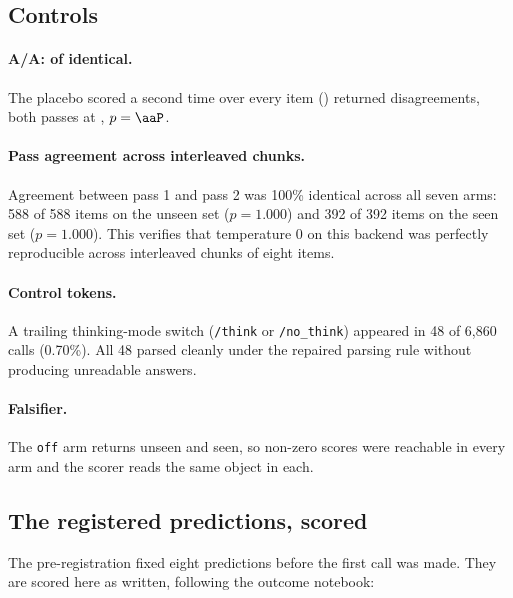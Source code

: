 \subsection{Controls}

\paragraph{A/A: \NUM{\aaPairs} of \NUM{\aaPairs} identical.} The placebo
scored a second time over every item () returned
\NUM{\aaDisagreements} disagreements, both passes at \NUM{\aaAccuracy},
$p = \NUM{\aaP}$.

\paragraph{Pass agreement across interleaved chunks.} Agreement between pass 1
and pass 2 was 100\% identical across all seven arms: 588 of 588 items on the
unseen set ($p = 1.000$) and 392 of 392 items on the seen set ($p = 1.000$).
This verifies that temperature 0 on this backend was perfectly reproducible across
interleaved chunks of eight items.

\paragraph{Control tokens.} A trailing thinking-mode switch (\texttt{/think} or
\texttt{/no\_think}) appeared in 48 of 6,860 calls (0.70\%). All 48 parsed cleanly
under the repaired parsing rule without producing unreadable answers.

\paragraph{Falsifier.} The \texttt{off} arm returns \NUM{\accUnseenOff} unseen
and \NUM{\accSeenOff} seen, so non-zero scores were reachable in every arm and
the scorer reads the same object in each.

\subsection{The registered predictions, scored}
\label{sec:predictions}

The pre-registration fixed eight predictions before the first call was made.
They are scored here as written, following the outcome notebook:

